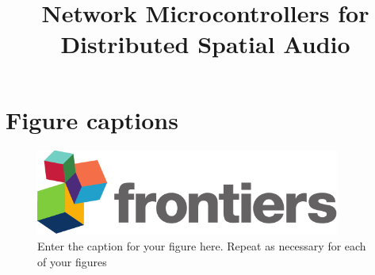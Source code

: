 \documentclass[utf8]{FrontiersinHarvard}
\begin{document}
    \onecolumn

    \title[Running Title]{Network Microcontrollers for Distributed Spatial Audio}

    \author[\firstAuthorLast ]{\Authors} %
    \address{} %
    \correspondance{} %

    \extraAuth{}%


    \maketitle


    
    


    
    


    \section*{Figure captions}


    \begin{figure}[h!]
        \begin{center}
            \includegraphics[width=10cm]{logo1}%
        \end{center}
        \caption{ Enter the caption for your figure here. Repeat as necessary for each of your figures}\label{fig:1}
    \end{figure}
\end{document}
